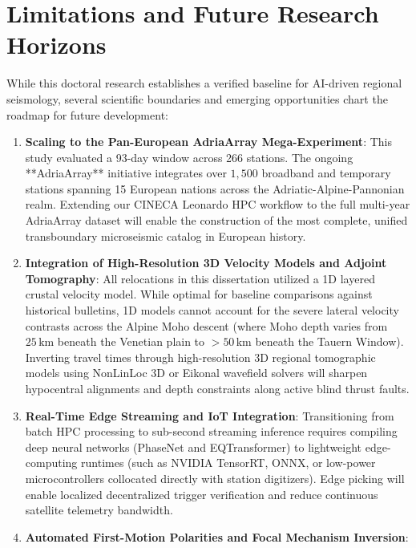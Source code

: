 \section{Limitations and Future Research Horizons}
\label{sec:conclusion_future_work}

While this doctoral research establishes a verified baseline for AI-driven regional seismology, several scientific boundaries and emerging opportunities chart the roadmap for future development:

\begin{enumerate}
  \item \textbf{Scaling to the Pan-European AdriaArray Mega-Experiment}:
  This study evaluated a 93-day window across 266 stations. The ongoing **AdriaArray** initiative integrates over $1{,}500$ broadband and temporary stations spanning 15 European nations across the Adriatic-Alpine-Pannonian realm. Extending our CINECA Leonardo HPC workflow to the full multi-year AdriaArray dataset will enable the construction of the most complete, unified transboundary microseismic catalog in European history.
  \item \textbf{Integration of High-Resolution 3D Velocity Models and Adjoint Tomography}:
  All relocations in this dissertation utilized a 1D layered crustal velocity model. While optimal for baseline comparisons against historical bulletins, 1D models cannot account for the severe lateral velocity contrasts across the Alpine Moho descent (where Moho depth varies from $25\,\unit{\kilo\meter}$ beneath the Venetian plain to $> 50\,\unit{\kilo\meter}$ beneath the Tauern Window). Inverting travel times through high-resolution 3D regional tomographic models using NonLinLoc 3D or Eikonal wavefield solvers will sharpen hypocentral alignments and depth constraints along active blind thrust faults.
  \item \textbf{Real-Time Edge Streaming and IoT Integration}:
  Transitioning from batch HPC processing to sub-second streaming inference requires compiling deep neural networks (PhaseNet and EQTransformer) to lightweight edge-computing runtimes (such as NVIDIA TensorRT, ONNX, or low-power microcontrollers collocated directly with station digitizers). Edge picking will enable localized decentralized trigger verification and reduce continuous satellite telemetry bandwidth.
  \item \textbf{Automated First-Motion Polarities and Focal Mechanism Inversion}:

\end{enumerate}
